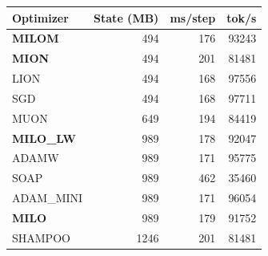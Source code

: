 \begin{tabular}{lrrr}
\toprule
Optimizer & State (MB) & ms/step & tok/s \\
\midrule
\textbf{MILOM} & 494 & 176 & 93243 \\
\textbf{MION} & 494 & 201 & 81481 \\
LION & 494 & 168 & 97556 \\
SGD & 494 & 168 & 97711 \\
MUON & 649 & 194 & 84419 \\
\textbf{MILO\_LW} & 989 & 178 & 92047 \\
ADAMW & 989 & 171 & 95775 \\
SOAP & 989 & 462 & 35460 \\
ADAM\_MINI & 989 & 171 & 96054 \\
\textbf{MILO} & 989 & 179 & 91752 \\
SHAMPOO & 1246 & 201 & 81481 \\
\bottomrule
\end{tabular}